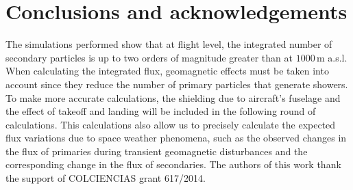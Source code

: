 \documentclass[3p,times,twocolumn]{elsarticle}
\begin{document}
\section{Conclusions and acknowledgements}
\label{sec:conclusions}

The simulations performed show that at flight level, the integrated number of
secondary particles is up to two orders of magnitude greater than at $1000$\,m
a.s.l. When calculating the integrated flux, geomagnetic effects must be taken
into account since they reduce the number of primary particles that generate
showers. To make more accurate calculations, the shielding due to aircraft's
fuselage and the effect of takeoff and landing will be included in the
following round of calculations. This calculations also allow us to precisely
calculate the expected flux variations due to space weather phenomena, such as
the observed changes in the flux of primaries during transient geomagnetic
disturbances and the corresponding change in the flux of secondaries. The
authors of this work thank the support of COLCIENCIAS grant 617/2014.  



\end{document}
